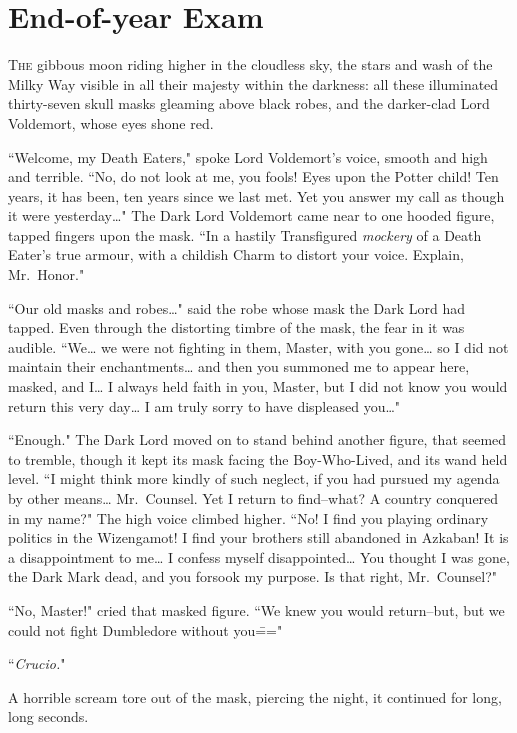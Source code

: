 \chapter{End-of-year Exam}

\lettrine{T}{he} gibbous moon riding higher in the cloudless sky, the stars and wash of the Milky Way visible in all their majesty within the darkness: all these illuminated thirty-seven skull masks gleaming above black robes, and the darker-clad Lord Voldemort, whose eyes shone red.

``Welcome, my Death Eaters," spoke Lord Voldemort's voice, smooth and high and terrible. ``No, do not look at me, you fools! Eyes upon the Potter child! Ten years, it has been, ten years since we last met. Yet you answer my call as though it were yesterday{\ldots}" The Dark Lord Voldemort came near to one hooded figure, tapped fingers upon the mask. ``In a hastily Transfigured \emph{mockery} of a Death Eater's true armour, with a childish Charm to distort your voice. Explain, Mr.~Honor."

``Our old masks and robes{\ldots}" said the robe whose mask the Dark Lord had tapped. Even through the distorting timbre of the mask, the fear in it was audible. ``We{\ldots} we were not fighting in them, Master, with you gone{\ldots} so I did not maintain their enchantments{\ldots} and then you summoned me to appear here, masked, and I{\ldots} I always held faith in you, Master, but I did not know you would return this very day{\ldots} I am truly sorry to have displeased you{\ldots}"

``Enough." The Dark Lord moved on to stand behind another figure, that seemed to tremble, though it kept its mask facing the Boy-Who-Lived, and its wand held level. ``I might think more kindly of such neglect, if you had pursued my agenda by other means{\ldots} Mr.~Counsel. Yet I return to find\---what? A country conquered in my name?" The high voice climbed higher. ``No! I find you playing ordinary politics in the Wizengamot! I find your brothers still abandoned in Azkaban! It is a disappointment to me{\ldots} I confess myself disappointed{\ldots} You thought I was gone, the Dark Mark dead, and you forsook my purpose. Is that right, Mr.~Counsel?"

``No, Master!" cried that masked figure. ``We knew you would return\---but, but we could not fight Dumbledore without you\==="

``\emph{Crucio.}"

A horrible scream tore out of the mask, piercing the night, it continued for long, long seconds.

